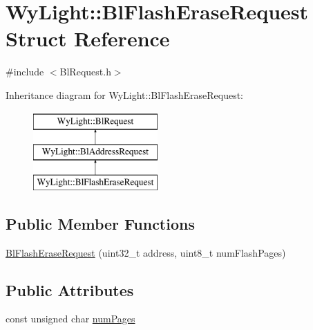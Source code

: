 \hypertarget{struct_wy_light_1_1_bl_flash_erase_request}{\section{Wy\-Light\-:\-:Bl\-Flash\-Erase\-Request Struct Reference}
\label{struct_wy_light_1_1_bl_flash_erase_request}
}


{\ttfamily \#include $<$Bl\-Request.\-h$>$}

Inheritance diagram for Wy\-Light\-:\-:Bl\-Flash\-Erase\-Request\-:\begin{figure}[H]
\begin{center}
\leavevmode
\includegraphics[height=3.000000cm]{struct_wy_light_1_1_bl_flash_erase_request}
\end{center}
\end{figure}
\subsection*{Public Member Functions}
\begin{DoxyCompactItemize}
\item 
\hyperlink{struct_wy_light_1_1_bl_flash_erase_request_ad069728b703ecc3830c589475664cf22}{Bl\-Flash\-Erase\-Request} (uint32\-\_\-t address, uint8\-\_\-t num\-Flash\-Pages)
\end{DoxyCompactItemize}
\subsection*{Public Attributes}
\begin{DoxyCompactItemize}
\item 
const unsigned char \hyperlink{struct_wy_light_1_1_bl_flash_erase_request_a4e95486e9c8f309b066e8251fc1d7593}{num\-Pages}
\end{DoxyCompactItemize}


